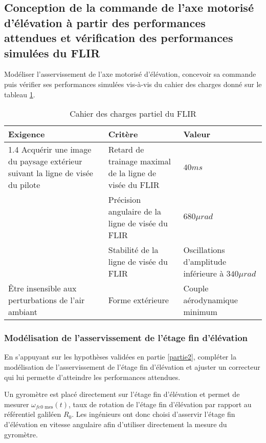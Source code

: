 \subsection{Conception de la commande de l'axe motorisé d'élévation à partir
des performances attendues et vérification des performances
simulées du FLIR}

\begin{obj}
Modéliser l'asservissement de l'axe motorisé d'élévation, concevoir sa commande puis vérifier ses performances
simulées vis-à-vis du cahier des charges donné sur le tableau \ref{tab2}.
\end{obj}

\begin{table}[!htb]
\begin{center}
\begin{tabular}{|p{}|p{}|p{}|}
\hline 
\textbf{Exigence} & \textbf{Critère} & \textbf{Valeur} \\ 
\hline 
1.4 Acquérir une image du paysage
extérieur suivant la ligne de visée
du pilote & Retard de trainage maximal de la
ligne de visée du FLIR & $40ms$ \\ 
\cline{2-3} 
& Précision angulaire de la ligne de
visée du FLIR & $680\mu rad$\\ 
\cline{2-3}  
 & Stabilité de la ligne de visée du
FLIR & Oscillations d'amplitude inférieure
à $340 \mu rad$ \\ 
\hline  
Être insensible aux perturbations
de l'air ambiant & Forme extérieure & Couple aérodynamique minimum\\ 
\hline
\end{tabular} 
\caption{Cahier des charges partiel du FLIR \label{tab2}}
\end{center}
\end{table}

\subsubsection{Modélisation de l'asservissement de l'étage fin d'élévation}

\begin{obj}
En s'appuyant sur les hypothèses validées en partie \ref{partie2}, compléter la modélisation de l'asservissement de
l'étage fin d'élévation et ajuster un correcteur qui lui permette d'atteindre les performances attendues.
\end{obj}

Un gyromètre est placé directement sur l'étage fin d'élévation et permet de mesurer $\omega_{fe0\text{ mes}}(t)$, taux de rotation de l'étage fin d'élévation par rapport au référentiel galiléen $R_0$. Les ingénieurs ont donc choisi d'asservir l'étage
fin d'élévation en vitesse angulaire afin d'utiliser directement la mesure du gyromètre.


